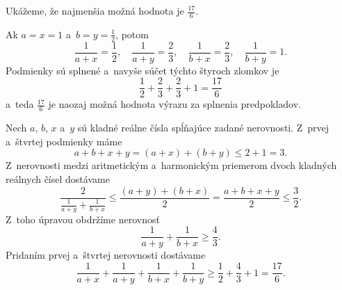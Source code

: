 {%
Ukážeme, že najmenšia možná hodnota je $\frac{17}{6}$.

Ak $a=x=1$ a~$b=y=\frac{1}{2}$, potom
$$
	\frac{1}{a+x} = \frac{1}{2}, \quad
		\frac{1}{a+y}= \frac{2}{3}, \quad
		\frac{1}{b+x} = \frac{2}{3},  \quad
		\frac{1}{b+y} = 1.
$$
Podmienky sú splnené a~navyše súčet týchto štyroch zlomkov je
$$
\frac{1}{2}+\frac{2}{3}+\frac{2}{3}+1=\frac{17}{6}
$$
a~teda $\frac{17}{6}$ je naozaj možná hodnota výrazu za splnenia predpokladov.


Nech $a$, $b$, $x$ a~$y$ sú kladné reálne čísla spĺňajúce zadané nerovnosti. Z~prvej a~štvrtej podmienky máme
$$
a+b+x+y=(a+x)+(b+y)\le 2+1=3.
$$
Z~nerovnosti medzi aritmetickým a~harmonickým priemerom dvoch kladných reálnych čísel dostávame
$$
\frac{2}{\frac{1}{a+y}+\frac{1}{b+x}}\le\frac{(a+y)+(b+x)}{2}=\frac{a+b+x+y}{2}\le\frac{3}{2}.
$$
Z~toho úpravou obdržíme nerovnosť
$$
\frac{1}{a+y}+\frac{1}{b+x}\ge\frac{4}{3}.
$$
Pridaním prvej a~štvrtej nerovnosti dostávame
$$
\frac{1}{a+x}+\frac{1}{a+y}+\frac{1}{b+x}+\frac{1}{b+y}\ge \frac{1}{2}+\frac{4}{3}+1=\frac{17}{6}.
$$
}

